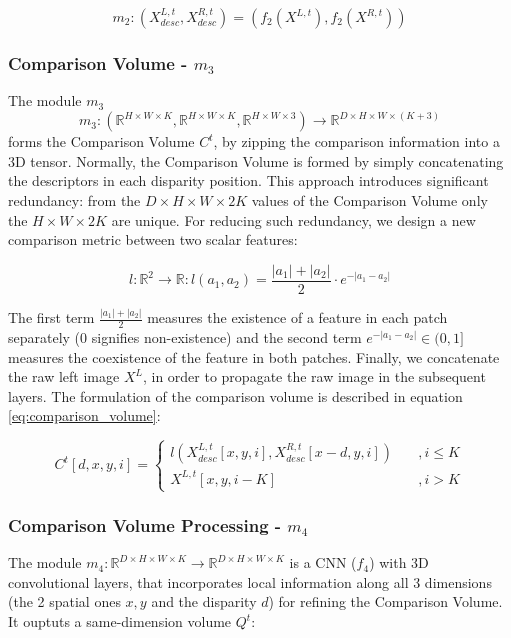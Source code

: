 \documentclass[runningheads]{llncs}
\begin{document}
\begin{equation} \label{eq:f_1}
    m_2:(X^{L,t}_{desc}, X^{R,t}_{desc}) = (f_2(X^{L,t}), f_2(X^{R, t}))
\end{equation} 

\subsubsection{Comparison Volume - $m_3$} The module $m_3$
$$m_3:(\mathbb{R}^{H \times W \times K}, \mathbb{R}^{H \times W \times K}, \mathbb{R}^{H \times W \times 3}) \rightarrow \mathbb{R}^{D \times H \times W \times (K+3)}$$ forms the Comparison Volume $C^t$, by zipping the comparison information into a 3D tensor. Normally, the Comparison Volume is formed by simply concatenating the descriptors in each disparity position. This approach introduces significant redundancy: from the $D \times H \times W \times 2K$ values of the Comparison Volume only the $H \times W \times 2K$ are unique. For reducing such redundancy, we design a new comparison metric between two scalar features:

\begin{equation} \label{eq:m}
    l: \mathbb{R}^2 \rightarrow \mathbb{R}: l(a_1, a_2) = \frac{|a_1| + |a_2|}{2} \cdot e^{-|a_1 - a_2|}    
\end{equation}

 The first term $\frac{|a_1| + |a_2|}{2}$ measures the existence of a feature in each patch separately ($0$ signifies non-existence) and the second term $e^{-|a_1 - a_2|} \in (0,1]$ measures the coexistence of the feature in both patches. Finally, we concatenate the raw left image $X^L$, in order to propagate the raw image in the subsequent layers. The formulation of the comparison volume is described in equation \ref{eq:comparison_volume}:

\begin{equation}\label{eq:comparison_volume}
C^t[d, x, y, i] = 
    \begin{cases}
        l( X^{L, t}_{desc}[x,y,i], X^{R, t}_{desc}[x-d,y, i]) &\quad ,i \leq K \\
        X^{L,t}[x,y,i-K] &\quad ,i > K
     \end{cases}
\end{equation}{}  


\subsubsection{Comparison Volume Processing - $m_4$} The module $m_4: \mathbb{R}^{D \times H \times W \times K} \rightarrow \mathbb{R}^{D \times H \times W \times K}$ is a CNN ($f_4$) with 3D convolutional layers, that incorporates local information along all 3 dimensions (the 2 spatial ones $x,y$ and the disparity $d$) for refining the Comparison Volume. It ouptuts a same-dimension volume $Q^t$:
\end{document}
